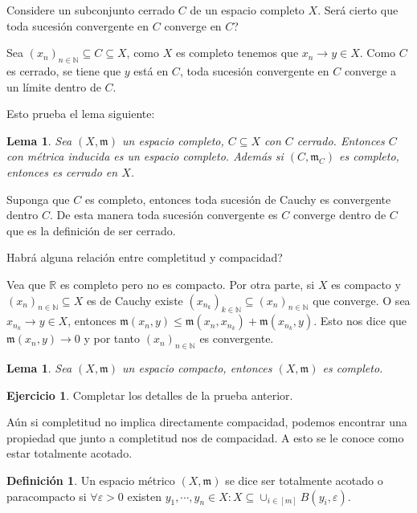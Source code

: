 \documentclass[12pt]{article}
\theoremstyle{plain}
\newtheorem{Lem}[Th]{Lema}             %
\theoremstyle{definition}
\newtheorem{Def}[Th]{Definición}       %
\newtheorem{Ej}[Th]{Ejercicio}
\theoremstyle{remark}
\numberwithin{equation}{section}
\newcommand{\bN}{\mathbb{N}}        %
\newcommand{\bR}{\mathbb{R}}        %
\newcommand{\mm}{\mathfrak{m}}      %
\renewcommand{\leq}{\leqslant}      %
\renewcommand{\:}{\colon}           %
\newcommand{\bonj}[1]{\left\lbrack#1\right\rbrack}
\begin{document}
\begin{multicols}{2}
Considere un subconjunto cerrado $C$ de un espacio completo $X$. Será cierto que toda sucesión convergente en $C$ converge en $C$?\par
Sea $(x_n)_{n\in\bN}\subseteq C\subseteq X$, como $X$ es completo tenemos que $x_n\to y\in X$. Como $C$ es cerrado, se tiene que $y$ está en $C$, toda sucesión convergente en $C$ converge a un límite dentro de $C$.\par
Esto prueba el lema siguiente:

\begin{Lem}
  Sea $(X,\mm)$ un espacio completo, $C\subseteq X$ con $C$ cerrado. Entonces $C$ con métrica inducida es un espacio completo. Además si $(C,\mm_C)$ es completo, entonces es cerrado en $X$.
\end{Lem}

\begin{ptcbp}
Suponga que $C$ es completo, entonces toda sucesión de Cauchy es convergente dentro $C$. De esta manera toda sucesión convergente es $C$ converge dentro de $C$ que es la definición de ser cerrado.
\end{ptcbp}

Habrá alguna relación entre completitud y compacidad?\par
Vea que $\bR$ es completo pero no es compacto. Por otra parte, si $X$ es compacto y $(x_n)_{n\in\bN}\subseteq X$ es de Cauchy existe $(x_{n_k})_{k\in\bN}\subseteq(x_n)_{n\in\bN}$ que converge. O sea $x_{n_k}\to y\in X$, entonces $\mm(x_n,y)\leq \mm(x_n,x_{n_k})+\mm(x_{n_k},y)$. Esto nos dice que $\mm(x_n,y)\to 0$ y por tanto $(x_n)_{n\in\bN}$ es convergente.

\begin{Lem}
  Sea $(X,\mm)$ un espacio compacto, entonces $(X,\mm)$ es completo.
\end{Lem}

\begin{Ej}
  Completar los detalles de la prueba anterior.
\end{Ej}

Aún si completitud no implica directamente compacidad, podemos encontrar una propiedad que junto a completitud nos de compacidad. A esto se le conoce como estar totalmente acotado.

\begin{Def}
  Un espacio métrico $(X,\mm)$ se dice ser totalmente acotado o paracompacto si $\forall\varepsilon>0$ existen $y_1,\cdots,y_n\in X\colon X\subseteq\cup_{i\in\bonj{m}}B(y_i,\varepsilon)$.
\end{Def}


\end{multicols}
\end{document}
